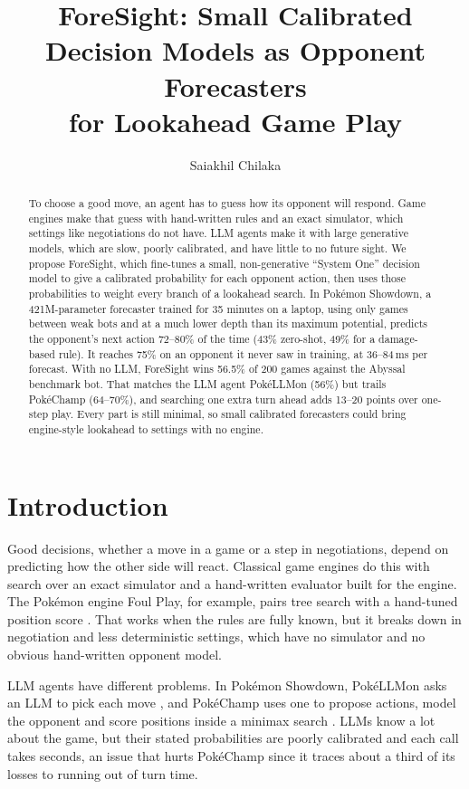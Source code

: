 \documentclass[letterpaper]{article} %
\title{ForeSight: Small Calibrated Decision Models as Opponent Forecasters\\for Lookahead Game Play}
\author{
    Saiakhil Chilaka
}
\begin{document}
\maketitle

\begin{abstract}
To choose a good move, an agent has to guess how its opponent will respond. Game engines make that guess with hand-written rules and an exact simulator, which settings like negotiations do not have. LLM agents make it with large generative models, which are slow, poorly calibrated, and have little to no future sight. We propose ForeSight, which fine-tunes a small, non-generative ``System One'' decision model to give a calibrated probability for each opponent action, then uses those probabilities to weight every branch of a lookahead search. In Pok\'emon Showdown, a 421M-parameter forecaster trained for 35 minutes on a laptop, using only games between weak bots and at a much lower depth than its maximum potential, predicts the opponent's next action 72--80\% of the time (43\% zero-shot, 49\% for a damage-based rule). It reaches 75\% on an opponent it never saw in training, at 36--84\,ms per forecast. With no LLM, ForeSight wins 56.5\% of 200 games against the Abyssal benchmark bot. That matches the LLM agent PokéLLMon (56\%) but trails PokéChamp (64--70\%), and searching one extra turn ahead adds 13--20 points over one-step play. Every part is still minimal, so small calibrated forecasters could bring engine-style lookahead to settings with no engine.
\end{abstract}

\begin{links}
\end{links}

\section{Introduction}
Good decisions, whether a move in a game or a step in negotiations, depend on predicting how the other side will react. Classical game engines do this with search over an exact simulator and a hand-written evaluator built for the engine. The Pok\'emon engine Foul Play, for example, pairs tree search with a hand-tuned position score \citep{foulplay}. That works when the rules are fully known, but it breaks down in negotiation and less deterministic settings, which have no simulator and no obvious hand-written opponent model.

LLM agents have different problems. In Pok\'emon Showdown, PokéLLMon asks an LLM to pick each move \citep{pokellmon}, and PokéChamp uses one to propose actions, model the opponent and score positions inside a minimax search \citep{pokechamp}. LLMs know a lot about the game, but their stated probabilities are poorly calibrated and each call takes seconds, an issue that hurts PokéChamp since it traces about a third of its losses to running out of turn time.
\end{document}
